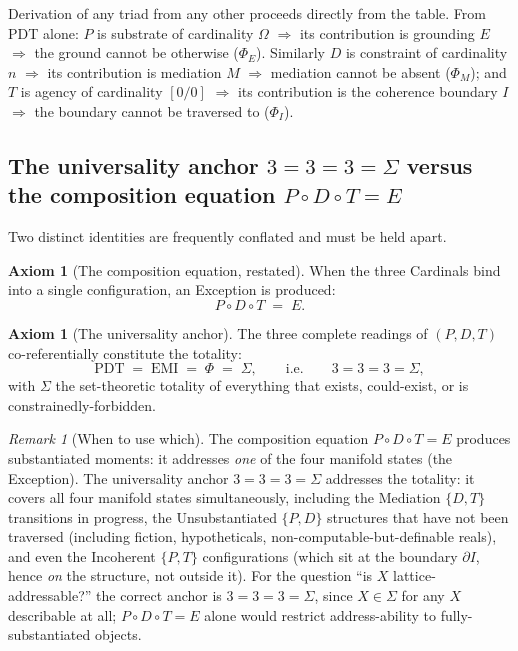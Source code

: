 \documentclass[11pt,a4paper]{article}
\theoremstyle{definition}
\newtheorem{axiom}[theorem]{Axiom}
\theoremstyle{remark}
\newtheorem{remark}[theorem]{Remark}
\begin{document}
Derivation of any triad from any other proceeds directly from the table. From PDT alone: $P$ is substrate of cardinality $\Omega$ $\Rightarrow$ its contribution is grounding $E$ $\Rightarrow$ the ground cannot be otherwise ($\Phi_{E}$). Similarly $D$ is constraint of cardinality $n$ $\Rightarrow$ its contribution is mediation $M$ $\Rightarrow$ mediation cannot be absent ($\Phi_{M}$); and $T$ is agency of cardinality $[0/0]$ $\Rightarrow$ its contribution is the coherence boundary $I$ $\Rightarrow$ the boundary cannot be traversed to ($\Phi_{I}$).

\subsection{The universality anchor $3=3=3=\Sigma$ versus the composition equation $P\circ D\circ T = E$}\label{subsec:anchor}

Two distinct identities are frequently conflated and must be held apart.

\begin{axiom}[The composition equation, restated]\label{ax:composition}
When the three Cardinals bind into a single configuration, an Exception is produced:
\[
P \circ D \circ T \;=\; E.
\]
\end{axiom}

\begin{axiom}[The universality anchor]\label{ax:anchor}
The three complete readings of $(P,D,T)$ co-referentially constitute the totality:
\[
\mathrm{PDT} \;=\; \mathrm{EMI} \;=\; \Phi \;=\; \Sigma, \qquad \text{i.e.} \qquad 3=3=3=\Sigma,
\]
with $\Sigma$ the set-theoretic totality of everything that exists, could-exist, or is constrainedly-forbidden.
\end{axiom}

\begin{remark}[When to use which]
The composition equation $P\circ D\circ T=E$ produces substantiated moments: it addresses \emph{one} of the four manifold states (the Exception). The universality anchor $3=3=3=\Sigma$ addresses the totality: it covers all four manifold states simultaneously, including the Mediation $\{D,T\}$ transitions in progress, the Unsubstantiated $\{P,D\}$ structures that have not been traversed (including fiction, hypotheticals, non-computable-but-definable reals), and even the Incoherent $\{P,T\}$ configurations (which sit at the boundary $\partial I$, hence \emph{on} the structure, not outside it). For the question ``is $X$ lattice-addressable?'' the correct anchor is $3=3=3=\Sigma$, since $X\in\Sigma$ for any $X$ describable at all; $P\circ D\circ T=E$ alone would restrict address-ability to fully-substantiated objects.
\end{remark}
\end{document}
